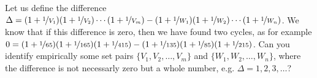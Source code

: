 Let us define the difference $\Delta=(1+\nicefrac{1}{V_1})(1+\nicefrac{1}{V_2})\cdots(1+\nicefrac{1}{V_m})-(1+\nicefrac{1}{W_1})(1+\nicefrac{1}{W_2})\cdots(1+\nicefrac{1}{W_n})$.
We know that if this difference is zero, then we have found two cycles, as for example $0=(1+\nicefrac{1}{65})(1+\nicefrac{1}{165})(1+\nicefrac{1}{415})-(1+\nicefrac{1}{135})(1+\nicefrac{1}{85})(1+\nicefrac{1}{215})$.
Can you identify empirically some set pairs $\{V_1,V_2,\ldots,V_m\}$ and $\{W_1,W_2,\ldots,W_n\}$, where the difference is not necessarly zero but a whole number, e.g. $\Delta=1,2,3,\ldots$?
